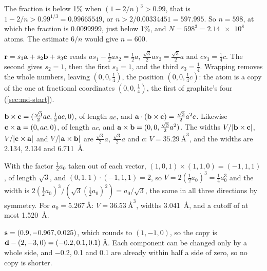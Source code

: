 \label{sec:md-solutions}

The fraction is below 1\% when $(1 - 2/n)^3 >
0.99$, that is $1 - 2/n > 0.99^{1/3} = 0.99665549$, or $n > 2/0.00334451 =
597.995$. So $n = 598$, at which the fraction is 0.0099999, just below
1\%, and $N = 598^3 = \num{2.14e8}$ atoms. The estimate $6/n$ would give
$n = 600$.

$\bm{\mathrm{r}} = s_1\bm{\mathrm{a}} + s_2\bm{\mathrm{b}} + s_3\bm{\mathrm{c}}$
reads $as_1 - \frac12as_2 = \frac12a$, $\frac{\sqrt3}2as_2 =
\frac{\sqrt3}2a$ and $cs_3 = \frac14c$. The second gives $s_2 = 1$, then
the first $s_1 = 1$, and the third $s_3 = \frac14$. Wrapping removes the
whole numbers, leaving $(0, 0, \frac14)$, the position $(0, 0, \frac14c)$:
the atom is a copy of the one at fractional coordinates $(0, 0, \frac14)$,
the first of graphite's four (\cref{sec:md-start}).

$\bm{\mathrm{b}}\times\bm{\mathrm{c}} = (\frac{\sqrt3}2ac,
\frac12ac, 0)$, of length $ac$, and $\bm{\mathrm{a}}\cdot(\bm{\mathrm{b}}\times\bm{\mathrm{c}}) =
\frac{\sqrt3}2a^2c$. Likewise $\bm{\mathrm{c}}\times\bm{\mathrm{a}} = (0, ac, 0)$, of length
$ac$, and $\bm{\mathrm{a}}\times\bm{\mathrm{b}} = (0, 0, \frac{\sqrt3}2a^2)$. The widths
$V/\lvert\bm{\mathrm{b}}\times\bm{\mathrm{c}}\rvert$, $V/\lvert\bm{\mathrm{c}}\times\bm{\mathrm{a}}\rvert$ and
$V/\lvert\bm{\mathrm{a}}\times\bm{\mathrm{b}}\rvert$ are $\frac{\sqrt3}2a$, $\frac{\sqrt3}2a$
and $c$: $V = \SI{35.29}{\angstrom\cubed}$, and the widths are 2.134,
2.134 and \SI{6.711}{\angstrom}.

With the factor $\frac12a_0$ taken out of each
vector, $(1, 0, 1)\times(1, 1, 0) = (-1, 1, 1)$, of length $\sqrt3$, and
$(0, 1, 1)\cdot(-1, 1, 1) = 2$, so $V = 2(\frac12a_0)^3 = \frac14a_0^3$
and the width is $2(\frac12a_0)^3/(\sqrt3(\frac12a_0)^2) = a_0/\sqrt3$,
the same in all three directions by symmetry. For $a_0 =
\SI{5.267}{\angstrom}$: $V = \SI{36.53}{\angstrom\cubed}$, widths
\SI{3.041}{\angstrom}, and a cutoff of at most \SI{1.520}{\angstrom}.

$\bm{\mathrm{s}} = (0.9, -0.967, 0.025)$, which rounds to
$(1, -1, 0)$, so the copy is $\bm{\mathrm{d}} - (2, -3, 0) = (-0.2, 0.1, 0.1)$\,\AA.
Each component can be changed only by a whole side, and $-0.2$, 0.1 and
0.1 are already within half a side of zero, so no copy is shorter.

